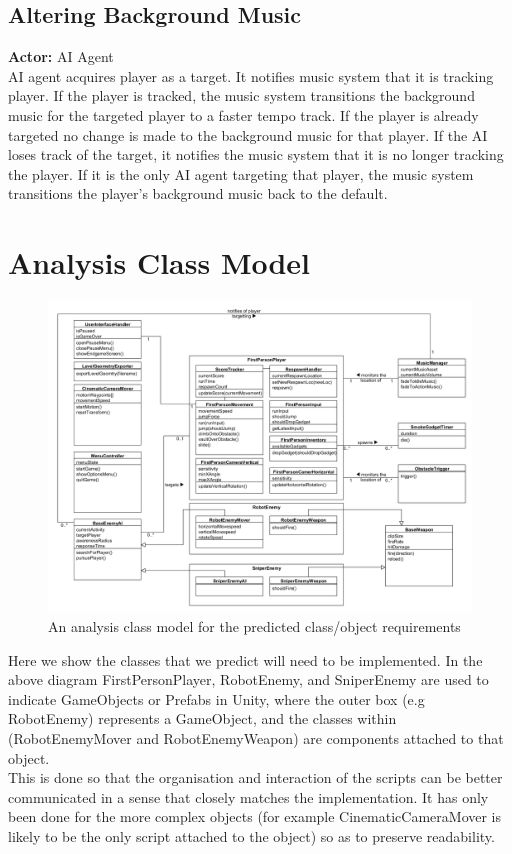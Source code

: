 \documentclass[a4paper,10pt]{article}
\begin{document}
\subsection{Altering Background Music}
\textbf{Actor:} AI Agent\smallskip\\
AI agent acquires player as a target. It notifies music system that it is tracking player. If the player is tracked, the music system transitions the background music for the targeted player to a faster tempo track. If the player is already targeted no change is made to the background music for that player. If the AI loses track of the target, it notifies the music system that it is no longer tracking the player. If it is the only AI agent targeting that player, the music system transitions the player's background music back to the default.

\section{Analysis Class Model}
\begin{figure}[H]
	\begin{center}
		\includegraphics[scale=0.4]{images/AnalysisClassDiagram.png}
		\caption{An analysis class model for the predicted class/object requirements}
	\end{center}
\end{figure}
Here we show the classes that we predict will need to be implemented. In the above diagram FirstPersonPlayer, RobotEnemy, and SniperEnemy are used to indicate GameObjects or Prefabs in Unity, where the outer box (e.g RobotEnemy) represents a GameObject, and the classes within (RobotEnemyMover and RobotEnemyWeapon) are components attached to that object. \\
This is done so that the organisation and interaction of the scripts can be better communicated in a sense that closely matches the implementation. It has only been done for the more complex objects (for example CinematicCameraMover is likely to be the only script attached to the object) so as to preserve readability.
\end{document}
